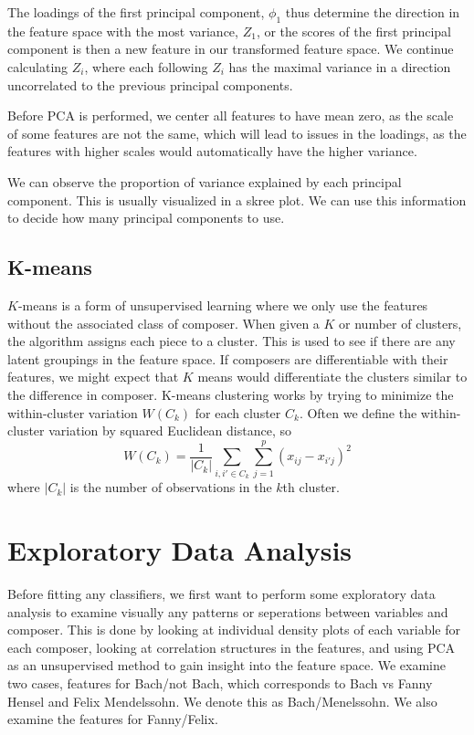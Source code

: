 \documentclass[12pt,twoside]{reedthesis}
\theoremstyle{definition}
\theoremstyle{definition}
\theoremstyle{definition}
\theoremstyle{remark}
\begin{document}
The loadings of the first principal component, \(\phi_1\) thus determine
the direction in the feature space with the most variance, \(Z_1\), or
the scores of the first principal component is then a new feature in our
transformed feature space. We continue calculating \(Z_i\), where each
following \(Z_i\) has the maximal variance in a direction uncorrelated
to the previous principal components.

Before PCA is performed, we center all features to have mean zero, as
the scale of some features are not the same, which will lead to issues
in the loadings, as the features with higher scales would automatically
have the higher variance.

We can observe the proportion of variance explained by each principal
component. This is usually visualized in a skree plot. We can use this
information to decide how many principal components to use.

\section{K-means}\label{k-means}

\(K\)-means is a form of unsupervised learning where we only use the
features without the associated class of composer. When given a \(K\) or
number of clusters, the algorithm assigns each piece to a cluster. This
is used to see if there are any latent groupings in the feature space.
If composers are differentiable with their features, we might expect
that \(K\) means would differentiate the clusters similar to the
difference in composer. K-means clustering works by trying to minimize
the within-cluster variation \(W(C_k)\) for each cluster \(C_k\). Often
we define the within-cluster variation by squared Euclidean distance, so
\[W(C_k) = \frac{1}{|C_k|} \sum_{i,i' \in C_k}\sum_{j = 1}^p (x_{ij} - x_{i'j})^2 \]
where \(|C_k|\) is the number of observations in the \(k\)th cluster.

\chapter{Exploratory Data Analysis}\label{exploratory-data-analysis}

Before fitting any classifiers, we first want to perform some
exploratory data analysis to examine visually any patterns or
seperations between variables and composer. This is done by looking at
individual density plots of each variable for each composer, looking at
correlation structures in the features, and using PCA as an unsupervised
method to gain insight into the feature space. We examine two cases,
features for Bach/not Bach, which corresponds to Bach vs Fanny Hensel
and Felix Mendelssohn. We denote this as Bach/Menelssohn. We also
examine the features for Fanny/Felix.
\end{document}
